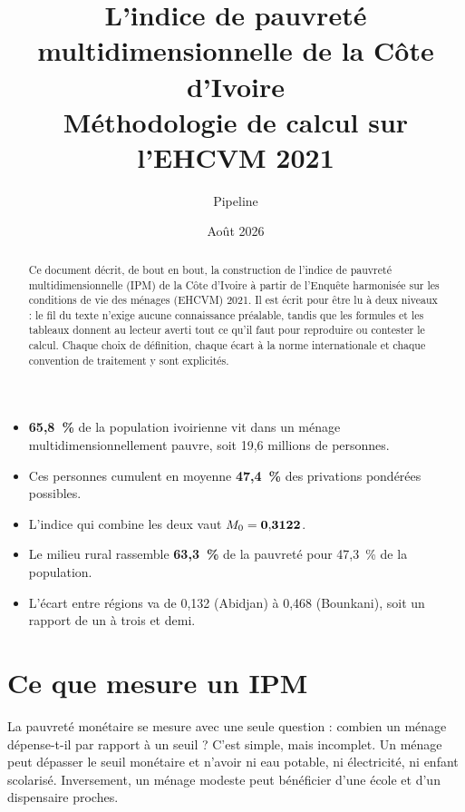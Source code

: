 \documentclass[11pt,a4paper]{article}
\title{\bfseries L'indice de pauvreté multidimensionnelle de la Côte d'Ivoire\\[4pt]
\large Méthodologie de calcul sur l'EHCVM 2021}
\author{Pipeline \col{PythonIPM}}
\date{Août 2026}
\begin{document}
\maketitle

\begin{abstract}
\noindent Ce document décrit, de bout en bout, la construction de l'indice de pauvreté
multidimensionnelle (IPM) de la Côte d'Ivoire à partir de l'Enquête harmonisée sur les conditions
de vie des ménages (EHCVM) 2021. Il est écrit pour être lu à deux niveaux : le fil du texte
n'exige aucune connaissance préalable, tandis que les formules et les tableaux donnent au lecteur
averti tout ce qu'il faut pour reproduire ou contester le calcul. Chaque choix de définition, chaque
écart à la norme internationale et chaque convention de traitement y sont explicités.
\end{abstract}

\begin{retenir}
\begin{itemize}
  \item \textbf{65,8~\%} de la population ivoirienne vit dans un ménage multidimensionnellement
        pauvre, soit 19,6 millions de personnes.
  \item Ces personnes cumulent en moyenne \textbf{47,4~\%} des privations pondérées possibles.
  \item L'indice qui combine les deux vaut $M_{0} = \mathbf{0{,}3122}$.
  \item Le milieu rural rassemble \textbf{63,3~\%} de la pauvreté pour 47,3~\% de la population.
  \item L'écart entre régions va de 0,132 (Abidjan) à 0,468 (Bounkani), soit un rapport de
        un à trois et demi.
\end{itemize}
\end{retenir}

\tableofcontents
\bigskip

\section{Ce que mesure un IPM}

La pauvreté monétaire se mesure avec une seule question : combien un ménage dépense-t-il par
rapport à un seuil ? C'est simple, mais incomplet. Un ménage peut dépasser le seuil monétaire et
n'avoir ni eau potable, ni électricité, ni enfant scolarisé. Inversement, un ménage modeste peut
bénéficier d'une école et d'un dispensaire proches.
\end{document}
